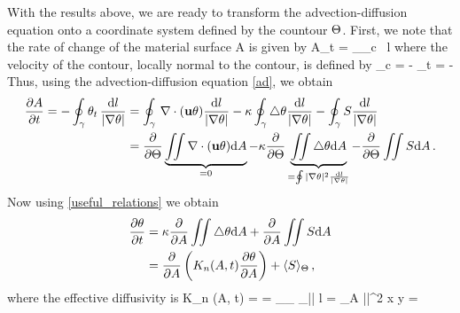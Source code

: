 \documentclass[11pt]{article}
\begin{document}
With the results above, we are ready to transform the advection-diffusion equation onto a coordinate system defined by the countour $\Theta$. First, we note that the rate of change of the  material surface A is given by
\beq
A_t =  \oint_\gamma \vu_c \cdot \hat{\vn} \, \dd l\com
\eeq
where the velocity of the contour, locally normal to the contour, is defined by
\beq
\vu_c = - \theta_t  = -  \hat{\vn}\per
\eeq
Thus, using the advection-diffusion equation \eqref{ad}, we obtain
\begin{align}
\frac{\partial A}{\partial t} =  - \oint_\gamma \theta_t \, \frac{{\rm d} l}{{|\nabla \theta|}} &= 
                       \oint_\gamma \, \nabla \cdot (\mathbf{u} \theta) \frac{{\rm d} l}{{|\nabla \theta|}} 
                      - \kappa \oint_\gamma \triangle \theta   \frac{{\rm d} l}{{|\nabla \theta|}} 
                      - \oint_\gamma S  \frac{{\rm d} l}{{|\nabla \theta|}}\nonumber \\
                     & =  \frac{\partial}{\partial \Theta}\underbrace{\iint \nabla \cdot (\mathbf{u} \theta) {\rm d} A}_{=0}
                        -  \kappa  \frac{\partial}{\partial \Theta}\underbrace{\iint \triangle \theta {\rm d} A}_{=\oint |\nabla\theta|^2\frac{{\rm d} l}{|\nabla \theta|}}
                        -  \frac{\partial}{\partial \Theta}\iint S  {\rm d} A  \, .
\end{align}
Now using \eqref{useful_relations} we obtain
\begin{align}
\frac{\partial \theta}{\partial t} &= \kappa \frac{\partial}{\partial A} \iint \triangle \theta {\rm d} A + \frac{\partial }{\partial A} \iint S  {\rm d} A \nonumber\\
                     &= \frac{\partial}{\partial A}\left(K_n(A,t) \frac{\partial \theta}{\partial A}\right) + \langle S \rangle_\Theta\, ,
\end{align}
where the effective diffusivity  is
\beq
\label{KeDefn}
K_n (A, t) =   
        =  \kappa  {}_{\oint_\gamma {}} \oint_\gamma |\nabla\vth| \dd l 
        =  \iint_{\p A}  \kappa  |\nabla\vth|^2 \dd x \dd y = 
         \per
\eeq
\end{document}
